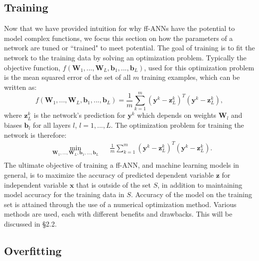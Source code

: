 \documentclass[letterpaper,12pt,titlepage,oneside,final]{book}
\begin{document}
	
	\subsection{Training}
	
	Now that we have provided intuition for why ff-ANNs have the potential to model complex functions, we focus this section on how the parameters of a network are tuned or ``trained" to meet potential. The goal of training is to fit the network to the training data by solving an optimization problem. Typically the objective function, $f(\mathbf{W}_{1},...,\mathbf{W}_{L},\mathbf{b}_{1},...,\mathbf{b}_{L})$, used for this optimization problem is the mean squared error of the set of all $m$ training examples, which can be written as: 
	\begin{equation}
	f(\mathbf{W}_{1},...,\mathbf{W}_{L},\mathbf{b}_{1},...,\mathbf{b}_{L}) = \frac{1}{m}\sum_{k=1}^{m}{(\mathbf{y}^{k} - \mathbf{z}_{L}^{k})^{T}(\mathbf{y}^{k} - \mathbf{z}_{L}^{k})},
	\label{equation:objective_function}
	\end{equation}
	where $\mathbf{z}_{L}^{k}$ is the network's prediction for $\mathbf{y}^{k}$ which depends on weights $\mathbf{W}_{l}$ and biases $\mathbf{b}_{l}$ for all layers $l$, $l=1,...,L$. The optimization problem for training the network is therefore:
	\begin{equation}
	\begin{aligned}
	& \underset{\mathbf{W}_{1},...,\mathbf{W}_{L},\mathbf{b}_{1},...,\mathbf{b}_{L}}{\text{min}}
	& & \frac{1}{m}\sum_{k=1}^{m}{(\mathbf{y}^{k} - \mathbf{z}_{L}^{k})^{T}(\mathbf{y}^{k} - \mathbf{z}_{L}^{k})}.\\
	\end{aligned}
	\label{equation:optimization}
	\end{equation}
	The ultimate objective of training a ff-ANN, and machine learning models in general, is to maximize the accuracy of predicted dependent variable $\mathbf{z}$ for independent variable $\mathbf{x}$ that is outside of the set $S$, in addition to maintaining model accuracy for the training data in $S$. Accuracy of the model on the training set is attained through the use of a numerical optimization method. Various methods are used, each with different benefits and drawbacks. This will be discussed in \S{2.2}.
	
	\subsection{Overfitting}
	
\end{document}
